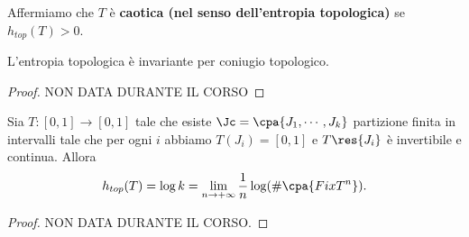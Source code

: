 \begin{definition}
Affermiamo che $T$ \`e \textbf{caotica (nel senso dell'entropia topologica)} se $h_{top}(T)>0$.
\end{definition}

\begin{proposition}\label{EntropiaTopologicaInvariantePerConiugioTopologico}
L'entropia topologica \`e invariante per coniugio topologico.
\end{proposition}
\begin{proof}
NON DATA DURANTE IL CORSO
\end{proof}

\begin{proposition}\label{EntropiaTopologicaEPartizioni}
Sia $T:[0,1]\to[0,1]$ tale che esiste $\Jc=\cpa{J_1,\cdots, J_k}$ partizione finita in intervalli tale che per ogni $i$ abbiamo $T(J_i)=[0,1]$ e $T\res{J_i}$ \`e invertibile e continua. Allora 
\[h_{top}(T)=\log k=\lim_{n\to+\infty}\frac1n\log(\#\cpa{Fix T^n}).\]
\end{proposition}
\begin{proof}
NON DATA DURANTE IL CORSO.
\end{proof}

